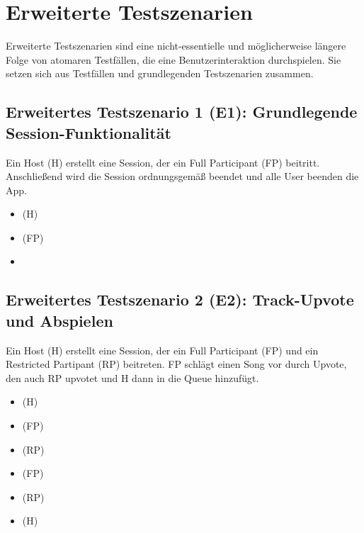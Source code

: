 \documentclass[oneside, ngerman]{sdqtechreport}
\begin{document}
\section{Erweiterte Testszenarien}
\label{sec:Tests:ErweiterteTestszenarien}

Erweiterte Testszenarien sind eine nicht-essentielle und möglicherweise längere Folge von atomaren Testfällen, die eine Benutzerinteraktion durchspielen. Sie setzen sich aus Testfällen und grundlegenden Testszenarien zusammen.


\subsection{Erweitertes Testszenario 1 (E1): Grundlegende Session-Funktionalität}
\label{subsec:Tests:ErweiterteTestszenarien:E1}
Ein Host (H) erstellt eine Session, der ein Full Participant (FP) beitritt. Anschließend wird die Session ordnungsgemäß beendet und alle User beenden die App.
\begin{itemize}
    \item \gOne (H)
    \item \gTwo (FP)
    \item \gEight
\end{itemize}


\subsection{Erweitertes Testszenario 2 (E2): Track-Upvote und Abspielen}
\label{subsec:Tests:ErweiterteTestszenarien:E1}
Ein Host (H) erstellt eine Session, der ein Full Participant (FP) und ein Restricted Partipant (RP) beitreten. FP schlägt einen Song vor durch Upvote, den auch RP upvotet und H dann in die Queue hinzufügt.
\begin{itemize}
    \item \gOne (H)
    \item \gTwo (FP)
    \item \gThree (RP)
    \item \gFour (FP)
    \item \gSix (RP)
    \item \gSeven (H)
\end{itemize}
\end{document}
